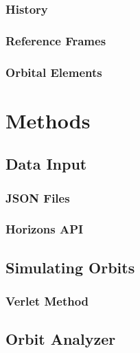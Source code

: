 \documentclass[a4paper,12pt]{article} %
\numberwithin{equation}{section} %
\numberwithin{figure}{section} %
\begin{document}
\subsubsection{History}

\subsubsection{Reference Frames}

\subsubsection{Orbital Elements}

\section{Methods}

\subsection{Data Input}

\subsubsection{JSON Files}

\subsubsection{Horizons API}


\subsection{Simulating Orbits}

\subsubsection{Verlet Method}


\subsection{Orbit Analyzer}
\end{document}

